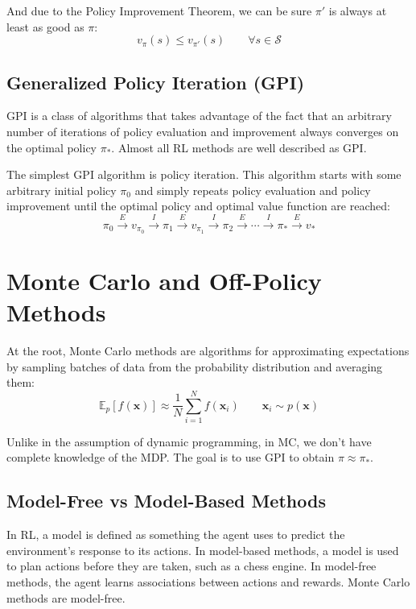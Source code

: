 \documentclass{article}
\begin{document}
And due to the Policy Improvement Theorem, we can be sure $\pi'$ is always at least as good as $\pi$:
\begin{equation*}
  v_\pi(s) \leq v_{\pi'}(s) \qquad \forall s \in \mathcal{S}
\end{equation*}

\subsection{Generalized Policy Iteration (GPI)}
GPI is a class of algorithms that takes advantage of the fact that an arbitrary number of iterations of policy evaluation and improvement 
always converges on the optimal policy $\pi_*$. Almost all RL methods are well described as GPI.

The simplest GPI algorithm is policy iteration. This algorithm starts with some arbitrary initial policy $\pi_0$ and simply repeats policy evaluation 
and policy improvement until the optimal policy and optimal value function are reached:
\begin{equation*}
  \pi_0 \xrightarrow{E} v_{\pi_0} \xrightarrow{I} \pi_1 \xrightarrow{E} v_{\pi_1} \xrightarrow{I} 
  \pi_2 \xrightarrow{E} \cdots \xrightarrow{I} \pi_* \xrightarrow{E} v_*
\end{equation*}



\section{Monte Carlo and Off-Policy Methods}
At the root, Monte Carlo methods are algorithms for approximating expectations by sampling batches of data from the 
probability distribution and averaging them:
\begin{equation}
  \mathbb{E}_p[f(\bm{x})] \approx \frac{1}{N} \sum_{i=1}^{N} f(\bm{x}_i) \qquad \bm{x}_i \sim p(\bm{x})
\end{equation}

Unlike in the assumption of dynamic programming, in MC, we don't have complete knowledge of the MDP. 
The goal is to use GPI to obtain $\pi \approx \pi_*$. 

\subsection{Model-Free vs Model-Based Methods}
In RL, a model is defined as something the agent uses to predict the environment's response to its actions. 
In model-based methods, a model is used to plan actions before they are taken, such as a chess engine.
In model-free methods, the agent learns associations between actions and rewards. 
Monte Carlo methods are model-free.
\end{document}
